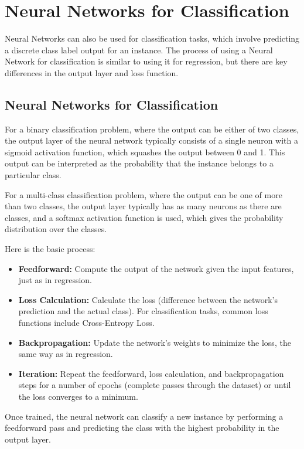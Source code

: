 \chapter{Neural Networks for Classification}


Neural Networks can also be used for classification tasks, which involve predicting a discrete class label output for an instance. The process of using a Neural Network for classification is similar to using it for regression, but there are key differences in the output layer and loss function.

\section{Neural Networks for Classification}
For a binary classification problem, where the output can be either of two classes, the output layer of the neural network typically consists of a single neuron with a sigmoid activation function, which squashes the output between 0 and 1. This output can be interpreted as the probability that the instance belongs to a particular class.

For a multi-class classification problem, where the output can be one of more than two classes, the output layer typically has as many neurons as there are classes, and a softmax activation function is used, which gives the probability distribution over the classes.

Here is the basic process:

\begin{itemize}
\item \textbf{Feedforward:} Compute the output of the network given the input features, just as in regression.

\item \textbf{Loss Calculation:} Calculate the loss (difference between the network's prediction and the actual class). For classification tasks, common loss functions include Cross-Entropy Loss.

\item \textbf{Backpropagation:} Update the network's weights to minimize the loss, the same way as in regression.

\item \textbf{Iteration:} Repeat the feedforward, loss calculation, and backpropagation steps for a number of epochs (complete passes through the dataset) or until the loss converges to a minimum.

\end{itemize}

Once trained, the neural network can classify a new instance by performing a feedforward pass and predicting the class with the highest probability in the output layer.